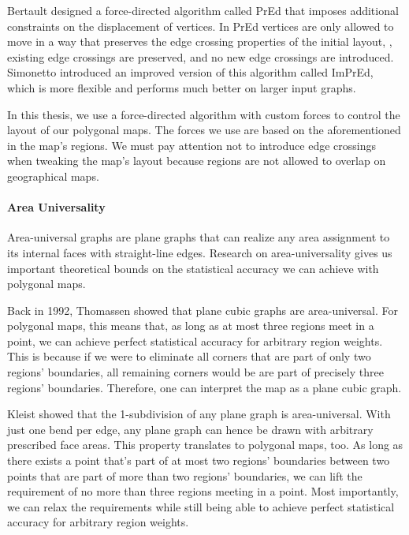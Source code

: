 Bertault \cite{bertault1999force} designed a force-directed algorithm called PrEd that imposes additional constraints on the displacement of vertices.
In PrEd vertices are only allowed to move in a way that preserves the edge crossing properties of the initial layout, \ie{}, existing edge crossings are preserved, and no new edge crossings are introduced.
Simonetto \etal{} \cite{simonetto2011impred} introduced an improved version of this algorithm called ImPrEd, which is more flexible and performs much better on larger input graphs.

In this thesis, we use a force-directed algorithm with custom forces to control the layout of our polygonal maps.
The forces we use are based on the aforementioned  in the map's regions.
We must pay attention not to introduce edge crossings when tweaking the map's layout because regions are not allowed to overlap on geographical maps.


\paragraph{Area Universality}

Area-universal graphs are plane graphs that can realize any area assignment to its internal faces with straight-line edges.
Research on area-universality gives us important theoretical bounds on the statistical accuracy we can achieve with polygonal maps.

Back in 1992, Thomassen \cite{thomassen1992plane} showed that plane cubic graphs are area-universal.
For polygonal maps, this means that, as long as at most three regions meet in a point, we can achieve perfect statistical accuracy for arbitrary region weights.
This is because if we were to eliminate all corners that are part of only two regions' boundaries, all remaining corners would be are part of precisely three regions' boundaries.
Therefore, one can interpret the map as a plane cubic graph.

Kleist \cite{kleist2018drawing} \cite{kleist2019planar} showed that the 1-subdivision of any plane graph is area-universal.
With just one bend per edge, any plane graph can hence be drawn with arbitrary prescribed face areas.
This property translates to polygonal maps, too.
As long as there exists a point that's part of at most two regions' boundaries between two points that are part of more than two regions' boundaries, we can lift the requirement of no more than three regions meeting in a point.
Most importantly, we can relax the requirements while still being able to achieve perfect statistical accuracy for arbitrary region weights.

